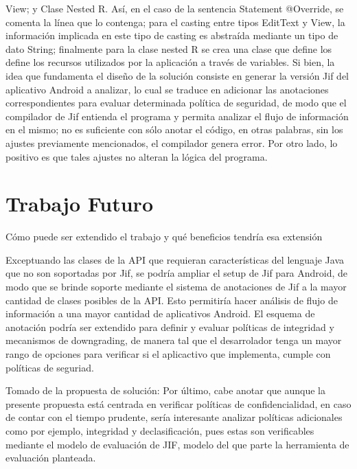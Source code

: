 View; y Clase Nested R. Así, en el caso de  la sentencia Statement @Override, se
comenta la línea que lo contenga; para el casting entre tipos EditText y View,
la información implicada en este tipo de casting es abstraída mediante un tipo
de dato String; finalmente para la clase nested R se crea una clase que define
los define los recursos utilizados por la aplicación a través de
variables.\newline 
Si bien, la idea que fundamenta el diseño de la solución consiste en generar la
versión Jif del aplicativo Android a analizar, lo cual se traduce en adicionar
las anotaciones correspondientes para evaluar determinada política de seguridad,
de modo que el compilador de Jif entienda el programa y permita analizar el
flujo de información en el mismo; no es suficiente con sólo anotar el código, en
otras palabras, sin los ajustes previamente mencionados, el compilador genera
error. Por otro lado, lo positivo es que tales ajustes no alteran la lógica del
programa.


\section{Trabajo Futuro}
Cómo puede ser extendido el trabajo y qué beneficios tendría esa
extensión\newline

Exceptuando las clases de la API que requieran características del lenguaje Java
que no son soportadas por Jif, se podría ampliar el setup de Jif para Android,
de modo que se brinde soporte mediante el sistema de anotaciones de Jif a la
mayor cantidad de clases posibles de la API. Esto permitiría hacer análisis de
flujo de información a una mayor cantidad de aplicativos Android.\newline
El esquema de anotación podría ser extendido para definir y evaluar políticas de
integridad y mecanismos de downgrading, de manera tal que el desarrolador tenga
un mayor rango de opciones para verificar si el aplicactivo que
implementa, cumple con políticas de seguriad.\newline

Tomado de la propuesta de solución:\newline
Por último, cabe anotar que aunque la presente propuesta está centrada en
verificar políticas de confidencialidad, en caso de contar con el tiempo
prudente, sería interesante analizar políticas adicionales como por ejemplo,
integridad y declasificación, pues estas son verificables mediante el modelo de
evaluación de JIF, modelo del que parte la herramienta de evaluación planteada.

